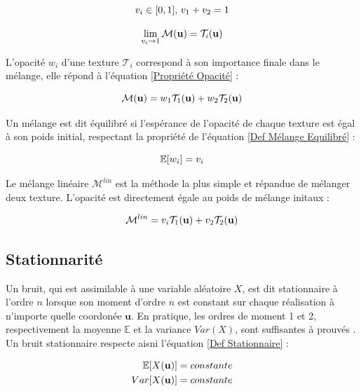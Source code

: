 \documentclass{article}
\begin{document}
\begin{equation}\centering\label{Propriété Alpha}
    v_i \in [0, 1] ,\, v_1 + v_2 = 1
\end{equation}

\begin{equation}\centering\label{Propriété Mélange}
    \lim_{v_i \rightarrow 1} \mathcal{M}(\mathbf{u}) = \mathcal{T}_i(\mathbf{u})
\end{equation}

L'opacité $w_i$ d'une texture $\mathcal{T}_i$ correspond à son importance
finale dans le mélange, elle répond à l'équation \ref{Propriété Opacité} :

\begin{equation}\centering\label{Propriété Opacité}
    \mathcal{M}(\mathbf{u}) = w_1 \mathcal{T}_1(\mathbf{u}) + w_2 \mathcal{T}_2(\mathbf{u})
\end{equation}

Un mélange est dit équilibré si l'espérance de l'opacité de chaque texture est
égal à son poids initial, respectant la propriété de l'équation \ref{Def
    Mélange Equilibré} :

\begin{equation}\centering\label{Def Mélange Equilibré}
    \mathbb{E}[w_i] = v_i
\end{equation}

Le mélange linéaire $\mathcal{M}^{lin}$ est la méthode la plus simple et
répandue de mélanger deux texture. L'opacité est directement égale au poids de
mélange initaux :

\begin{equation}\centering\label{Mélange Linéaire}
    \mathcal{M}^{lin} = v_i \mathcal{T}_1(\mathbf{u}) + v_2 \mathcal{T}_2(\mathbf{u})
\end{equation}

\subsection{Stationnarité}

Un bruit, qui est assimilable à une variable aléatoire $X$, est dit
stationnaire à l'ordre $n$ lorsque son moment d'ordre $n$ est constant sur
chaque réalisation à n'importe quelle coordonée $\mathbf{u}$. En pratique, les
ordres de moment 1 et 2, respectivement la moyenne $\mathbb{E}$ et la variance
$Var(X)$, sont suffisantes à prouvés \cite{SOA_Noise}. Un bruit stationnaire
respecte aisni l'équation \ref{Def Stationnaire} :

\begin{equation}\centering\label{Def Stationnaire}
    \begin{split}
        \mathbb{E}[X(\mathbf{u})] &= constante
        \\
        Var[X(\mathbf{u})] &= constante
    \end{split}
\end{equation}
\end{document}
